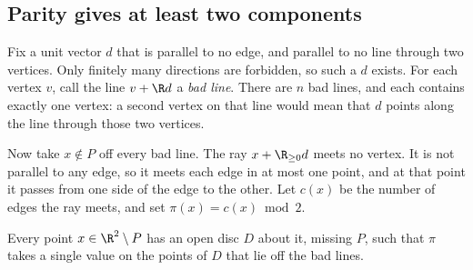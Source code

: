 \subsection*{Parity gives at least two components}

Fix a unit vector $d$ that is parallel to no edge, and parallel to no line through two vertices. Only finitely many directions are forbidden, so such a $d$ exists. For each vertex $v$, call the line $v+\R d$ a \emph{bad line}. There are $n$ bad lines, and each contains exactly one vertex: a second vertex on that line would mean that $d$ points along the line through those two vertices.

Now take $x\notin P$ off every bad line. The ray $x+\R_{\ge0}d$ meets no vertex. It is not parallel to any edge, so it meets each edge in at most one point, and at that point it passes from one side of the edge to the other. Let $c(x)$ be the number of edges the ray meets, and set $\pi(x)=c(x)\bmod 2$.

\begin{lemma}\label{lem:parity}
Every point $x\in\R^2\setminus P$ has an open disc $D$ about it, missing $P$, such that $\pi$ takes a single value on the points of $D$ that lie off the bad lines.
\end{lemma}


